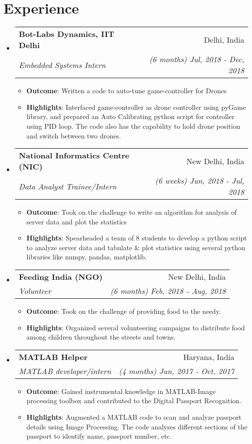 \documentclass[letterpaper,11pt]{article}
\makeatletter
\newcommand{\resumeItem}[2]{
  \item\small{
    \textbf{#1}{: #2 \vspace{-2pt}}
  }
}
\newcommand{\resumeSubheading}[4]{
  \vspace{-1pt}\item
    \begin{tabular*}{0.97\textwidth}{l@{\extracolsep{\fill}}r}
      \textbf{#1} & #2 \\
      \textit{\small#3} & \textit{\small #4} \\
    \end{tabular*}\vspace{-5pt}
}
\newcommand{\resumeSubHeadingListStart}{\begin{itemize}[leftmargin=*]}
\newcommand{\resumeSubHeadingListEnd}{\end{itemize}}
\newcommand{\resumeItemListStart}{\begin{itemize}}
\newcommand{\resumeItemListEnd}{\end{itemize}\vspace{-5pt}}
\makeatother
\begin{document}
\newpage

\section{Experience}
  \resumeSubHeadingListStart
    \resumeSubheading
      {Bot-Labs Dynamics, IIT Delhi}{Delhi, India}
      {Embedded Systems Intern}{(6 months) Jul, 2018 - Dec, 2018}
      \resumeItemListStart
        \resumeItem{Outcome}
          {Written a code to auto-tune game-controller for Drones}
        \resumeItem{Highlights}
          {Interfaced game-controller as drone controller using pyGame library, and prepared an Auto Calibrating python script for controller using PID loop. The code also has the capability to hold drone position and switch between two drones.}
      \resumeItemListEnd

    \resumeSubheading
      {National Informatics Centre (NIC)}{New Delhi, India}
      {Data Analyst Trainee/Intern}{(6 weeks) Jun, 2018 - Jul, 2018}
      \resumeItemListStart
        \resumeItem{Outcome}
          {Took on the challenge to write an algorithm for analysis of server data and plot the statistics }
        \resumeItem{Highlights}
          {Spearheaded a team of 8 students to develop a python script to analyze server data and tabulate \& plot statistics using several python libraries like numpy, pandas, matplotlib.}
      \resumeItemListEnd

    \resumeSubheading
      {Feeding India (NGO)}{New Delhi, India}
      {Volunteer}{(6 months) Feb, 2018 - Aug, 2018}
      \resumeItemListStart
        \resumeItem{Outcome}
          {Took on the challenge of providing food to the needy.}
        \resumeItem{Highlights}
          {Organized several volunteering campaigns to distribute food among children throughout the streets and towns.}
      \resumeItemListEnd
      
    \resumeSubheading
      {MATLAB Helper}{Haryana, India}
      {MATLAB developer/intern}{(4 months) Jun, 2017 - Oct, 2017}
      \resumeItemListStart
        \resumeItem{Outcome}
          {Gained instrumental knowledge in MATLAB-Image processing toolbox and contributed to the Digital Passport Recognition.}
        \resumeItem{Highlights}
          {Augmented a MATLAB code to scan and analyze passport details using Image Processing. The code analyses different sections of the passport to identify name, passport number, etc.}
      \resumeItemListEnd
  \resumeSubHeadingListEnd
\end{document}
